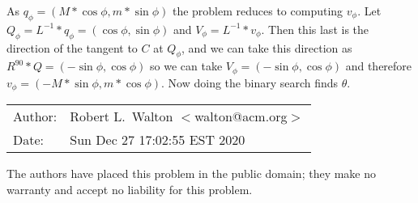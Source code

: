 \documentclass[12pt]{article}
\begin{document}
As $q_\phi = (M*\cos\phi,m*\sin\phi)$ the problem reduces to computing $v_\phi$.
Let $Q_\phi = L^{-1}*q_\phi = (\cos\phi,\sin\phi)$ and
$V_\phi=L^{-1}*v_\phi$.  Then this last is the direction of the tangent
to $C$ at $Q_\phi$, and we can take this direction as
$R^{90}*Q=(-\sin\phi,\cos\phi)$ so we can take
$V_\phi=(-\sin\phi,\cos\phi)$ and therefore $v_\phi=(-M*\sin\phi,m*\cos\phi)$.
Now doing the binary search finds $\theta$.



\bigskip

\begin{tabular}{ll}
Author:	      & Robert L.~Walton $<$walton@acm.org$>$ \\
Date:         & Sun Dec 27 17:02:55 EST 2020

\end{tabular}

The authors have placed this problem in the public domain;
they make no warranty and accept no liability for this problem.
\end{document}

